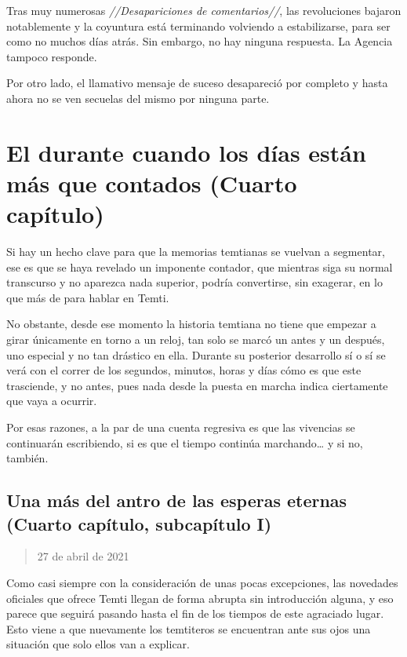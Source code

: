 \documentclass[
  spanish,
]{book}
\begin{document}
Tras muy numerosas \emph{//Desapariciones de comentarios//}, las revoluciones bajaron notablemente y la coyuntura está terminando volviendo a estabilizarse, para ser como no muchos días atrás. Sin embargo, no hay ninguna respuesta. La Agencia tampoco responde.

Por otro lado, el llamativo mensaje de suceso desapareció por completo y hasta ahora no se ven secuelas del mismo por ninguna parte.

\hypertarget{el-durante-cuando-los-duxedas-estuxe1n-muxe1s-que-contados-cuarto-capuxedtulo}{%
\chapter{El durante cuando los días están más que contados (Cuarto capítulo)}\label{el-durante-cuando-los-duxedas-estuxe1n-muxe1s-que-contados-cuarto-capuxedtulo}}

Si hay un hecho clave para que la memorias temtianas se vuelvan a segmentar, ese es que se haya revelado un imponente contador, que mientras siga su normal transcurso y no aparezca nada superior, podría convertirse, sin exagerar, en lo que más de para hablar en Temti.

No obstante, desde ese momento la historia temtiana no tiene que empezar a girar únicamente en torno a un reloj, tan solo se marcó un antes y un después, uno especial y no tan drástico en ella. Durante su posterior desarrollo sí o sí se verá con el correr de los segundos, minutos, horas y días cómo es que este trasciende, y no antes, pues nada desde la puesta en marcha indica ciertamente que vaya a ocurrir.

Por esas razones, a la par de una cuenta regresiva es que las vivencias se continuarán escribiendo, si es que el tiempo continúa marchando\ldots{} y si no, también.

\hypertarget{una-muxe1s-del-antro-de-las-esperas-eternas-cuarto-capuxedtulo-subcapuxedtulo-i}{%
\section{Una más del antro de las esperas eternas (Cuarto capítulo, subcapítulo I)}\label{una-muxe1s-del-antro-de-las-esperas-eternas-cuarto-capuxedtulo-subcapuxedtulo-i}}

\begin{quote}
27 de abril de 2021
\end{quote}

Como casi siempre con la consideración de unas pocas excepciones, las novedades oficiales que ofrece Temti llegan de forma abrupta sin introducción alguna, y eso parece que seguirá pasando hasta el fin de los tiempos de este agraciado lugar.\\
Esto viene a que nuevamente los temtiteros se encuentran ante sus ojos una situación que solo ellos van a explicar.
\end{document}
